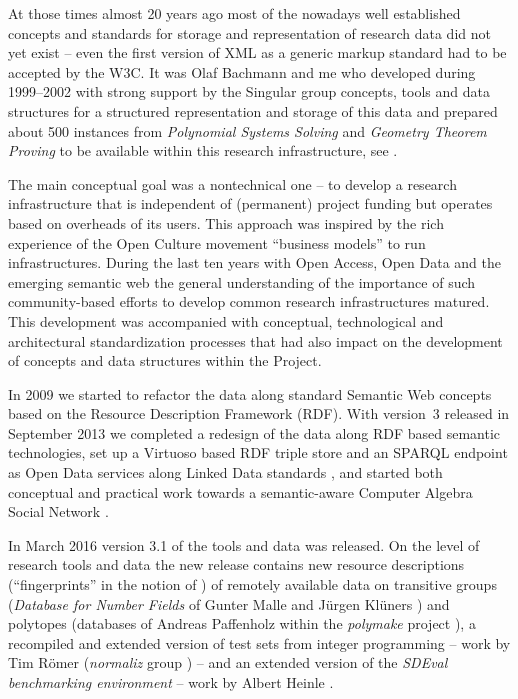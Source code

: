 \documentclass[11pt]{article}
\begin{document}
At those times almost 20 years ago most of the nowadays well established
concepts and standards for storage and representation of research data did not
yet exist -- even the first version of XML as a generic markup standard had to
be accepted by the W3C. It was Olaf Bachmann and me who developed during
1999--2002 with strong support by the Singular group concepts, tools and data
structures for a structured representation and storage of this data and
prepared about 500 instances from \emph{Polynomial Systems Solving} and
\emph{Geometry Theorem Proving} to be available within this research
infrastructure, see \cite{Bachmann2000}.

The main conceptual goal was a nontechnical one -- to develop a research
infrastructure that is independent of (permanent) project funding but operates
based on overheads of its users. This approach was inspired by the rich
experience of the Open Culture movement ``business models'' to run
infrastructures.  During the last ten years with Open Access, Open Data and the
emerging semantic web the general understanding of the importance of such
community-based efforts to develop common research infrastructures matured.
This development was accompanied with conceptual, technological and
architectural standardization processes that had also impact on the development
of concepts and data structures within the {\SD} Project.

In 2009 we started to refactor the data along standard Semantic Web concepts
based on the Resource Description Framework (RDF).  With {\SD} version~3
released in September 2013 we completed a redesign of the data along RDF based
semantic technologies, set up a Virtuoso based RDF triple store and an SPARQL
endpoint as Open Data services along Linked Data standards \cite{lod}, and
started both conceptual and practical work towards a semantic-aware Computer
Algebra Social Network \cite{cicm-14}.

In March 2016 version 3.1 of the {\SD} tools and data was released. On the
level of research tools and data the new release contains new resource
descriptions (``fingerprints'' in the notion of \cite{cicm-14}) of remotely
available data on transitive groups (\emph{Database for Number Fields} of
Gunter Malle and J\"urgen Kl\"uners \cite{MalleKlueners}) and polytopes
(databases of Andreas Paffenholz \cite{Paffenholz} within the \emph{polymake}
project \cite{polymake}), a recompiled and extended version of test sets from
integer programming -- work by Tim R\"omer (\emph{normaliz} group
\cite{normaliz}) -- and an extended version of the \emph{SDEval benchmarking
  environment} -- work by Albert Heinle \cite{heinle-15}.
\end{document}
